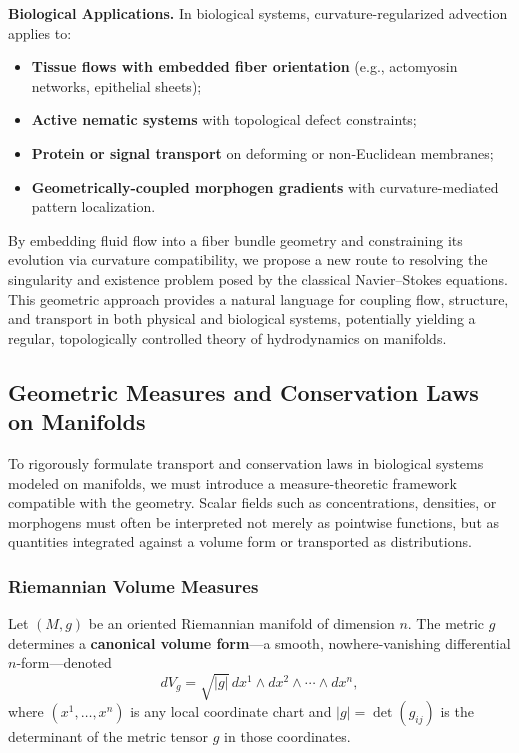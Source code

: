 \textbf{Biological Applications.} In biological systems, curvature-regularized advection applies to:
\begin{itemize}
  \item \textbf{Tissue flows with embedded fiber orientation} (e.g., actomyosin networks, epithelial sheets);
  \item \textbf{Active nematic systems} with topological defect constraints;
  \item \textbf{Protein or signal transport} on deforming or non-Euclidean membranes;
  \item \textbf{Geometrically-coupled morphogen gradients} with curvature-mediated pattern localization.
\end{itemize}

By embedding fluid flow into a fiber bundle geometry and constraining its evolution via curvature compatibility, we propose a new route to resolving the singularity and existence problem posed by the classical Navier--Stokes equations. This geometric approach provides a natural language for coupling flow, structure, and transport in both physical and biological systems, potentially yielding a regular, topologically controlled theory of hydrodynamics on manifolds.



\subsection{Geometric Measures and Conservation Laws on Manifolds}

To rigorously formulate transport and conservation laws in biological systems modeled on manifolds, we must introduce a measure-theoretic framework compatible with the geometry. Scalar fields such as concentrations, densities, or morphogens must often be interpreted not merely as pointwise functions, but as quantities integrated against a volume form or transported as distributions.

\subsubsection{Riemannian Volume Measures}
\label{subsec:riemannian_volume}

Let $(M, g)$ be an oriented Riemannian manifold of dimension $n$. The metric $g$ determines a \textbf{canonical volume form}---a smooth, nowhere-vanishing differential $n$-form---denoted
\begin{equation}
\label{eq:volume_form}
dV_g = \sqrt{|g|} \, dx^1 \wedge dx^2 \wedge \cdots \wedge dx^n,
\end{equation}
where $(x^1, \dots, x^n)$ is any local coordinate chart and $|g| = \det(g_{ij})$ is the determinant of the metric tensor $g$ in those coordinates.

